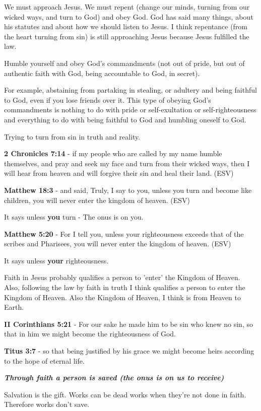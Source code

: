 \documentclass[11pt]{article}
\begin{document}
We must approach Jesus.
We must repent (change our minds, turning from our wicked ways, and turn to God) and obey God.
God has said many things, about his statutes and about how we should listen to Jesus.
I think repentance (from the heart turning from sin) is still approaching Jesus because Jesus fulfilled the law.

Humble yourself and obey God's commandments (not out of pride, but out of authentic faith with God, being accountable to God, in secret).

For example, abstaining from partaking in stealing, or adultery and being faithful to God, even if you lose friends over it.
This type of obeying God's commandments is nothing to do with pride or self-exultation or self-righteousness and everything to do with being faithful to God and humbling oneself to God.

Trying to turn from sin in truth and reality.

\textbf{2 Chronicles 7:14} - if my people who are called by my name humble themselves, and pray and seek my face and turn from their wicked ways, then I will hear from heaven and will forgive their sin and heal their land. (ESV)

\textbf{Matthew 18:3} - and said, Truly, I say to you, unless you turn and become like children, you will never enter the kingdom of heaven. (ESV)

It says unless \textbf{you} turn - The onus is on you.

\textbf{Matthew 5:20} - For I tell you, unless your righteousness exceeds that of the scribes and Pharisees, you will never enter the kingdom of heaven. (ESV)

It says unless \textbf{your} righteousness.

Faith in Jesus probably qualifies a person to 'enter' the Kingdom of Heaven.
Also, following the law by faith in truth I think qualifies a person to enter the Kingdom of Heaven.
Also the Kingdom of Heaven, I think is from Heaven to Earth.

\textbf{II Corinthians 5:21} - For our sake he made him to be sin who knew no sin, so that in him we might become the righteousness of God.

\textbf{Titus 3:7} - so that being justified by his grace we might become heirs according to the hope of eternal life.

\emph{\textbf{Through faith a person is saved (the onus is on us to receive)}}

Salvation is the gift. Works can be dead works when they're not done in faith. Therefore works don't save.
\end{document}
